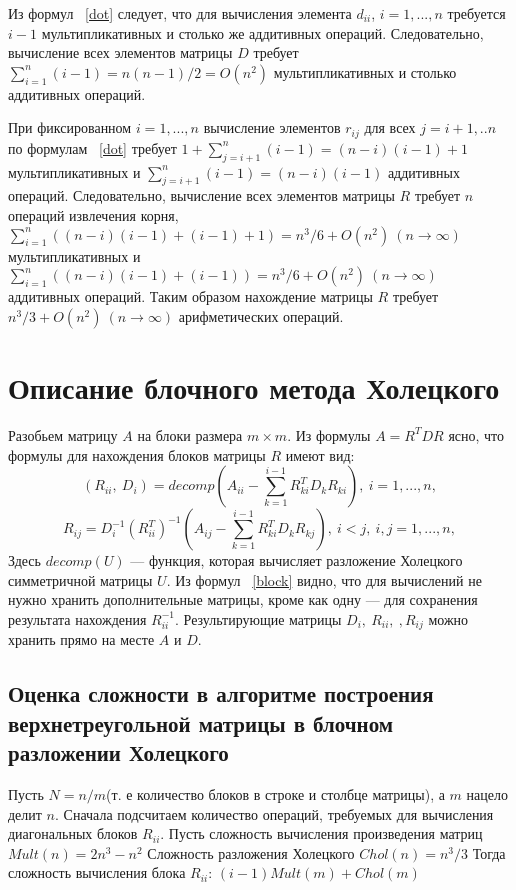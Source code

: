 \documentclass[a4paper, 12pt]{article}
\begin{document}
Из формул ~\eqref{dot} следует, что для вычисления элемента $d_{ii}$, $i=1,...,n$
требуется $i-1$ мультипликативных и столько же аддитивных операций. 
Следовательно, вычисление всех элементов матрицы $D$ требует
$\sum_{i=1}^n(i-1) = n(n-1)/2 = O(n^2)$ мультипликативных и столько 
аддитивных операций.

При фиксированном $i=1,...,n$ вычисление элементов $r_{ij}$ для всех 
$j=i+1,..n$ по формулам ~\eqref{dot} требует $1+\sum_{j=i+1}^n(i-1)=
(n-i)(i-1)+1$ мультипликативных и $\sum_{j=i+1}^n(i-1)=
(n-i)(i-1)$ аддитивных операций. Следовательно, вычисление всех
элементов матрицы $R$ требует $n$ операций извлечения корня,
$\sum_{i=1}^n((n-i)(i-1)+(i-1)+1)=n^3/6+O(n^2) \ (n \rightarrow \infty)$
мультипликативных и
$\sum_{i=1}^n((n-i)(i-1)+(i-1))=n^3/6+O(n^2) \ (n \rightarrow \infty)$
аддитивных операций.
Таким образом нахождение матрицы $R$ требует $n^3/3+O(n^2)\ (n \to \infty)$
арифметических операций.

\section{Описание блочного метода Холецкого}

Разобьем матрицу $A$ на блоки размера $m\times m$.
Из формулы $A = R^TDR$ ясно, что формулы для нахождения блоков 
матрицы $R$ имеют вид:
\begin{equation} \label{block}
 (R_{ii},\ D_{i}) = decomp(A_{ii} - \sum_{k=1}^{i-1}
R_{ki}^TD_kR_{ki}),\  i=1,...,n,
\end{equation}
$$
R_{ij} = D_i^{-1}(R_{ii}^T)^{-1}(A_{ij} - \sum_{k=1}^{i-1}
R_{ki}^TD_kR_{kj}),\  
i<j, \ i,j=1,...,n,
$$
Здесь $decomp(U)$ --- функция, которая вычисляет разложение
Холецкого симметричной матрицы $U$.
Из формул ~\eqref{block} видно, что для вычислений 
не нужно хранить дополнительные матрицы, кроме как одну --- для
сохранения результата нахождения $R_{ii}^{-1}$.
Результирующие матрицы $D_i,\ R_{ii}, \ ,R_{ij}$
можно хранить прямо на месте $A$ и $D$.




\subsection{Оценка сложности в алгоритме построения верхнетреугольной матрицы
в блочном разложении Холецкого}

Пусть $N=n/m$(т. е количество блоков в строке и столбце матрицы),
 а $m$ нацело делит $n$.
Сначала подсчитаем количество операций, требуемых для
 вычисления диагональных блоков $R_{ii}$.
Пусть сложность вычисления произведения матриц 
$Mult(n) = 2n^3-n^2$
\newline
Сложность разложения Холецкого
$Chol(n) = n^3/3$
\newline
Тогда сложность вычисления блока $R_{ii}$: 
$(i-1)Mult(m)+Chol(m)$
\newline
\end{document}

